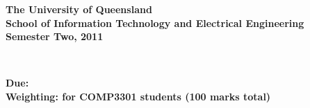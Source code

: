 \begin{center}
\large \textbf{The University of Queensland} \\
\large \textbf{School of Information Technology and Electrical Engineering} \\
\large \textbf{Semester Two, 2011}
\end{center}

\begin{center}
\Large \textbf{\pdfsubj} \\
\Large \textbf{\pdftitle}
\end{center}

\begin{center}
\large \textbf{Due: \duedate} \\
\large \textbf{Weighting: \assignweight for COMP3301 students (100 marks total)}
\end{center}
